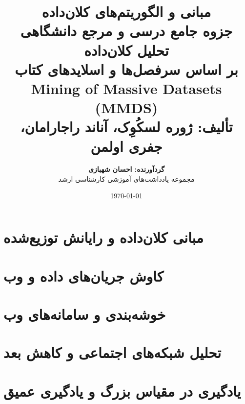 \documentclass[11pt,a4paper,oneside]{book}
\title{%
    \Huge\textbf{مبانی و الگوریتم‌های کلان‌داده}\\[0.5em]
    \LARGE جزوه جامع درسی و مرجع دانشگاهی تحلیل کلان‌داده\\[0.3em]
    \large بر اساس سرفصل‌ها و اسلایدهای کتاب Mining of Massive Datasets (MMDS)\\[0.2em]
    \normalsize تألیف: ژوره لسکُوِک، آناند راجارامان، جفری اولمن
}
\author{\textbf{گردآورنده: احسان شهبازی}\\[0.3em]\large مجموعه یادداشت‌های آموزشی کارشناسی ارشد}
\date{\today}
\begin{document}
\maketitle

\frontmatter



\tableofcontents
\newpage

\mainmatter

\part{مبانی کلان‌داده و رایانش توزیع‌شده}




\part{کاوش جریان‌های داده و وب}




\part{خوشه‌بندی و سامانه‌های وب}




\part{تحلیل شبکه‌های اجتماعی و کاهش بعد}



\part{یادگیری در مقیاس بزرگ و یادگیری عمیق}



\backmatter



\end{document}
